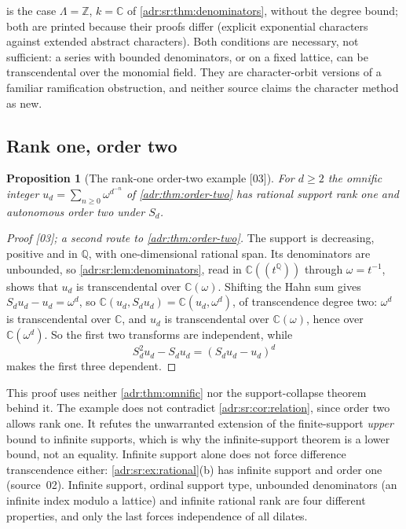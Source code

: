 \documentclass[11pt,letterpaper]{article}
\numberwithin{equation}{section}
\newtheorem{proposition}[proposition]{Proposition}
\theoremstyle{definition}
\theoremstyle{remark}
\newcommand{\C}{\mathbb C}
\newcommand{\Q}{\mathbb Q}
\newcommand{\Z}{\mathbb Z}
\newcommand{\src}[1]{\textup{[#1]}}%
\begin{document}
 is the case $\Lambda=\Z$, $k=\C$ of
\cref{adr:sr:thm:denominators}, without the degree bound; both are printed
because their proofs differ (explicit exponential characters against extended
abstract characters). Both conditions are necessary, not sufficient: a series
with bounded denominators, or on a fixed lattice, can be transcendental over
the monomial field. They are character-orbit versions of a familiar
ramification obstruction, and neither source claims the character method as
new.

\subsection{Rank one, order two}

\begin{proposition}[The rank-one order-two example \src{03}]
\label{adr:sr:prop:order-two}
For $d\ge2$ the omnific integer $u_d=\sum_{n\ge0}\omega^{d^{-n}}$ of
\cref{adr:thm:order-two} has rational support rank one and autonomous order
two under $S_d$.
\end{proposition}
\begin{proof}[Proof \src{03}; a second route to \cref{adr:thm:order-two}]
The support is decreasing, positive and in $\Q$, with one-dimensional rational
span. Its denominators are unbounded, so \cref{adr:sr:lem:denominators}, read
in $\C((t^\Q))$ through $\omega=t^{-1}$, shows that $u_d$ is transcendental
over $\C(\omega)$. Shifting the Hahn sum gives $S_du_d-u_d=\omega^d$, so
$\C(u_d,S_du_d)=\C(u_d,\omega^d)$, of transcendence degree two: $\omega^d$ is
transcendental over $\C$, and $u_d$ is transcendental over $\C(\omega)$,
hence over $\C(\omega^d)$. So the first two transforms are independent, while
\begin{equation}\label{adr:sr:eq:rankone}
 S_d^2u_d-S_du_d=(S_du_d-u_d)^d
\end{equation}
makes the first three dependent.
\end{proof}

This proof uses neither \cref{adr:thm:omnific} nor the support-collapse theorem
behind it. The example does not contradict \cref{adr:sr:cor:relation}, since
order two allows rank one. It refutes the unwarranted extension of the
finite-support \emph{upper} bound to infinite supports, which is why the
infinite-support theorem is a lower bound, not an equality. Infinite support
alone does not force difference transcendence either:
\cref{adr:sr:ex:rational}(b) has infinite support and order one (source~02).
Infinite support, ordinal support type, unbounded denominators (an infinite
index modulo a lattice) and infinite rational rank are four different
properties, and only the last forces independence of all dilates.
\end{document}
